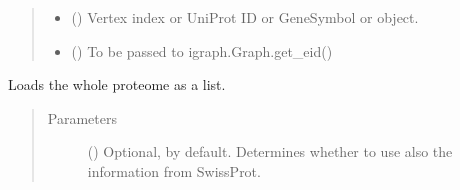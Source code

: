 \documentclass[letterpaper,10pt,english]{sphinxmanual}
\begin{document}
\begin{fulllineitems}
\begin{fulllineitems}
\begin{quote}
\begin{description}
\begin{itemize}
\item {} 
 (\sphinxstyleliteralemphasis{\sphinxupquote{,}}) \textendash{} Vertex index or UniProt ID or GeneSymbol or 
object.

\item {} 
 () \textendash{} To be passed to igraph.Graph.get\_eid()

\end{itemize}

\end{description}\end{quote}

\end{fulllineitems}


\begin{fulllineitems}
\label{\detokenize{main:pypath.main.PyPath.proteins}}
\end{fulllineitems}


\begin{fulllineitems}
\label{\detokenize{main:pypath.main.PyPath.proteome_list}}
Loads the whole proteome as a list.
\begin{quote}\begin{description}
\item[{Parameters}] \leavevmode
{} () \textendash{} Optional,  by default. Determines whether to use
also the information from SwissProt.

\end{description}\end{quote}

\end{fulllineitems}


\begin{fulllineitems}
\label{\detokenize{main:pypath.main.PyPath.ps}}
\end{fulllineitems}


\end{fulllineitems}
\end{document}
